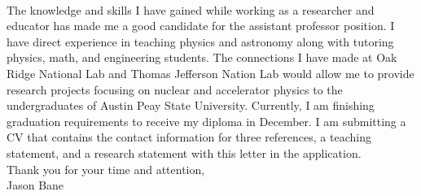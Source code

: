 \documentclass[12pt,letterpaper]{article}
\begin{document}
\paragraph{}The knowledge and skills I have gained while working as a researcher and educator has made me a good candidate for the assistant professor position. I have direct experience in teaching physics and astronomy along with tutoring physics, math, and engineering students.  The connections I have made at Oak Ridge National Lab and Thomas Jefferson Nation Lab would allow me to provide research projects focusing on nuclear and accelerator physics to the undergraduates of Austin Peay State University.
Currently, I am finishing graduation requirements to receive my diploma in December. I am submitting a CV that contains the contact information for three references, a teaching statement, and a research statement with this letter in the application. 
\\

\noindent Thank you for your time and attention,\\
\noindent Jason Bane
\end{document}
